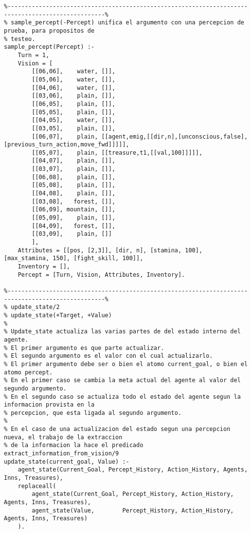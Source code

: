 \documentclass[a4paper,12pt]{report}
\begin{document}
\begin{scriptsize}
\begin{verbatim}
%--------------------------------------------------------------------------------------------------%
% sample_percept(-Percept) unifica el argumento con una percepcion de prueba, para propositos de 
% testeo. 
sample_percept(Percept) :-
    Turn = 1,
    Vision = [
        [[06,06],    water, []],
        [[05,06],    water, []],
        [[04,06],    water, []],
        [[03,06],    plain, []],
        [[06,05],    plain, []],
        [[05,05],    plain, []],
        [[04,05],    water, []],
        [[03,05],    plain, []],
        [[06,07],    plain, [[agent,emig,[[dir,n],[unconscious,false],[previous_turn_action,move_fwd]]]]],
        [[05,07],    plain, [[treasure,t1,[[val,100]]]]],
        [[04,07],    plain, []],
        [[03,07],    plain, []],
        [[06,08],    plain, []],
        [[05,08],    plain, []],
        [[04,08],    plain, []],
        [[03,08],   forest, []],
        [[06,09], mountain, []],
        [[05,09],    plain, []],
        [[04,09],   forest, []],
        [[03,09],    plain, []]
        ],
    Attributes = [[pos, [2,3]], [dir, n], [stamina, 100], [max_stamina, 150], [fight_skill, 100]],
    Inventory = [],
    Percept = [Turn, Vision, Attributes, Inventory].

%--------------------------------------------------------------------------------------------------%
% update_state/2
% update_state(+Target, +Value)
% 
% Update_state actualiza las varias partes de del estado interno del agente.
% El primer argumento es que parte actualizar.
% El segundo argumento es el valor con el cual actualizarlo.
% El primer argumento debe ser o bien el atomo current_goal, o bien el atomo percept.
% En el primer caso se cambia la meta actual del agente al valor del segundo argumento.
% En el segundo caso se actualiza todo el estado del agente segun la informacion provista en la 
% percepcion, que esta ligada al segundo argumento.
%
% En el caso de una actualizacion del estado segun una percepcion nueva, el trabajo de la extraccion
% de la informacion la hace el predicado extract_information_from_vision/9
update_state(current_goal, Value) :- 
    agent_state(Current_Goal, Percept_History, Action_History, Agents, Inns, Treasures),
    replaceall(
        agent_state(Current_Goal, Percept_History, Action_History, Agents, Inns, Treasures),
        agent_state(Value,        Percept_History, Action_History, Agents, Inns, Treasures)
    ).


\end{verbatim}
\end{scriptsize}
\end{document}
